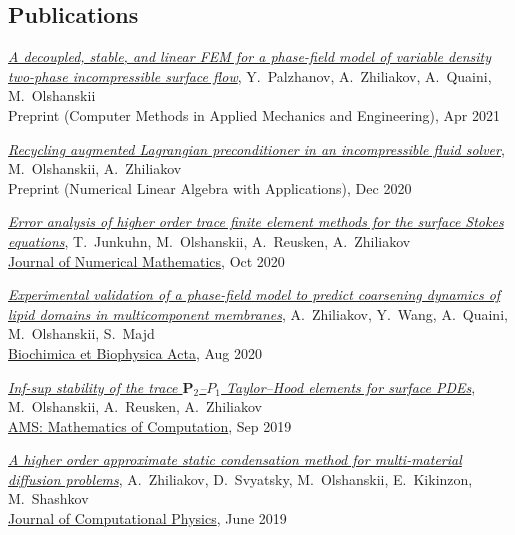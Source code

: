 \documentclass[a4paper,12pt]{article}
\begin{document}
	\subsection*{Publications}
	
	\begin{etaremune}[topsep=0pt]
		\item \textit{\href{https://arxiv.org/abs/2104.08996}{A decoupled, stable, and linear FEM for a phase-field model of variable density two-phase incompressible surface flow}}, Y.~Palzhanov, A.~Zhiliakov, A.~Quaini, M.~Olshanskii\\
		Preprint (Computer Methods in Applied Mechanics and Engineering), Apr 2021
		\item \textit{\href{https://arxiv.org/abs/2012.10073}{Recycling augmented Lagrangian preconditioner in an incompressible fluid solver}}, M.~Olshanskii, A.~Zhiliakov\\
		Preprint (Numerical Linear Algebra with Applications), Dec 2020
		\item \textit{\href{https://arxiv.org/abs/2003.06972}{Error analysis of higher order trace finite element methods for the surface Stokes equations}}, T.~Junkuhn, M.~Olshanskii, A.~Reusken, A.~Zhiliakov\\
		\href{https://doi.org/10.1515/jnma-2020-0017}{Journal of Numerical Mathematics}, Oct 2020		
		\item \textit{\href{https://arxiv.org/abs/2006.14125}{Experimental validation of a phase-field model to predict coarsening dynamics of lipid domains in multicomponent membranes}}, A.~Zhiliakov, Y.~Wang, A.~Quaini, M.~Olshanskii, S.~Majd\\
		\href{https://doi.org/10.1016/j.bbamem.2020.183446}{Biochimica et Biophysica Acta}, Aug 2020
		\item \textit{\href{https://arxiv.org/abs/1909.02990}{Inf-sup stability of the trace $\mathbf P_2$--$P_1$ Taylor--Hood elements for surface PDEs}}, M.~Olshanskii, A.~Reusken, A.~Zhiliakov\\ \href{https://doi.org/10.1090/mcom/3551}{AMS: Mathematics of Computation}, Sep 2019 
		\item \textit{\href{https://www.researchgate.net/publication/333900759_A_higher_order_approximate_static_condensation_method_for_multi-material_diffusion_problems}{A higher order approximate static condensation method for multi-material diffusion problems}}, A.~Zhiliakov, D.~Svyatsky, M.~Olshanskii, E.~Kikinzon, M.~Shashkov\\ \href{https://doi.org/10.1016/j.jcp.2019.06.044}{Journal of Computational Physics}, June 2019\\

\end{etaremune}
\end{document}
